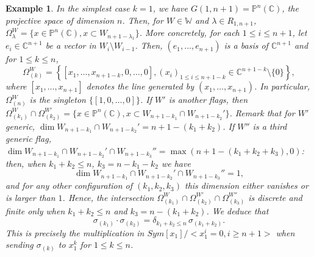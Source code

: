 \documentclass[10pt,11pt]{amsart}%
\newtheorem{example}[theorem]{Example}
\begin{document}
\begin{example}\label{Example:P1}
In the simplest case $k=1$, we have $G(1,n+1)=\mathbb{P}^n(\mathbb{C})$, the projective space of dimension $n$. Then, for $W\in\mathbb{W}$ and $\lambda\in R_{1,n+1}$, 
$\Omega_{\lambda}^W=\{x\in \mathbb{P}^n(\mathbb{C}),x\subset W_{n+1-\lambda_1}\}$. More concretely, for each $1\leq i\leq n+1$, let $e_i\in \mathbb{C}^{n+1}$ be a vector in $W_{i}\setminus W_{i-1}$. Then, $(e_1,\ldots,e_{n+1})$ is a basis of $\mathbb{C}^{n+1}$ and for $1\leq k\leq n$,
$$\Omega_{(k)}^W=\left\{[x_1,\ldots,x_{n+1-k},0,\ldots,0], (x_i)_{1\leq i\leq n+1-k}\in \mathbb{C}^{n+1-k}\setminus\{0\}\right\},$$
where $[x_1,\ldots,x_{n+1}]$ denotes the line generated by $(x_1,\ldots,x_{n+1})$. In particular, $\Omega_{(n)}^W$ is the singleton $\{[1,0,\ldots,0]\}$. If $W'$ is another flags, then $\Omega_{(k_1)}^W\cap\Omega_{(k_2)}^{W'}=\{x\in \mathbb{P}^n(\mathbb{C}),x\subset W_{n+1-k_1}\cap W_{n+1-k_2}'\}$. Remark that for $W'$ generic, $\dim W_{n+1-k_1}\cap W_{n+1-k_2}'=n+1-(k_1+k_2)$. If $W''$ is a third generic flag, $\dim W_{n+1-k_1}\cap W_{n+1-k_2}'\cap W_{n+1-k_3}''=\max(n+1-(k_1+k_2+k_3),0)$: then, when $k_1+k_2\leq n$, $k_3=n-k_1-k_2$ we have 
$$\dim W_{n+1-k_1}\cap W_{n+1-k_2}'\cap W_{n+1-k_3}''=1,$$
and for any other configuration of $(k_1,k_2,k_3)$ this dimension either vanishes or is larger than $1$. Hence, the intersection $\Omega_{(k_1)}^W\cap\Omega_{(k_2)}^{W'}\cap \Omega_{(k_3)}^{W''}$ is discrete and finite only when $k_1+k_2\leq n$ and $k_3=n-(k_1+k_2)$. We deduce that 
$$\sigma_{(k_1)}\cdot\sigma_{(k_2)}=\delta_{k_1+k_2\leq n}\,\sigma_{(k_1+k_2)}.$$
This is precisely the multiplication in $Sym[x_1]/<x_1^i=0,i\geq n+1>$ when sending $\sigma_{(k)}$ to $x_1^k$ for $1\leq k\leq n$.
\end{example}
\end{document}
